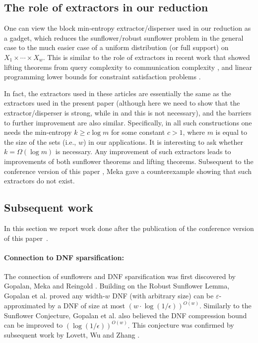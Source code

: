\documentclass[11pt]{article}
\numberwithin{equation}{section}
\theoremstyle{definition}
\theoremstyle{plain}
\newcommand{\eps}{\varepsilon}
\begin{document}
%
%
%

\subsection{The role of extractors in our reduction}
One can view the block min-entropy extractor/disperser used in our reduction as a gadget, which
reduces the sunflower/robust sunflower problem in the general case to the much easier case of a uniform distribution (or full support) on $X_{1}
\times \cdots \times X_{w}$. This is similar to the role of extractors
in recent %
work  %
that showed lifting theorems from query complexity to
communication complexity \cite{GLMWZ16}, and linear programming lower bounds for constraint satisfaction problems \cite{KMR17}.

In fact, the extractors used in these %
articles  %
are essentially the same as the extractors used in %
the present paper   %
(although %
here  %
we need to show that the extractor/disperser is strong, while
in \cite{GLMWZ16} and \cite{KMR17} this is not necessary), and the barriers
%
to  %
further improvement are also
similar. Specifically, in all such constructions one needs the min-entropy $k \geq c \log m$ for some constant $c>1$, where $m$ is equal to the size of the sets (i.e., $w$) in our applications. It is interesting to ask whether $k=\Omega(\log m)$ is necessary. Any improvement of such extractors leads
to  %
improvements of both sunflower theorems and lifting theorems. Subsequent to the conference version of
this paper \cite{conf-version}, %
Meka \cite{meka2018} gave a counterexample showing that such extractors do not exist.

%
\subsection{Subsequent work}   %
\label{sec: sub}

%
In this section we report work done after the publication of
the conference version of this paper~\cite{conf-version}.   %

\paragraph{Connection to DNF sparsification:} The connection of sunflowers and DNF sparsification was first discovered by Gopalan, Meka and Reingold \cite{gopalan2013dnf}. %
Building on the  %
%
Robust Sunflower Lemma,
Gopalan {et al.} \cite{gopalan2013dnf} proved any width-$w$ DNF (with arbitrary size) can be $\eps$-approximated by a DNF of size at most $(w\cdot \log(1/\epsilon))^{O(w)}.$
%
Similarly to  %
the Sunflower Conjecture, Gopalan {et al.} also believed the DNF compression bound can be improved to $( \log(1/\epsilon))^{O(w)}.$ This conjecture was confirmed by subsequent
%
work by   %
Lovett, Wu and Zhang \cite{lovett2019dnf2,LovettWZ19}.
\end{document}
